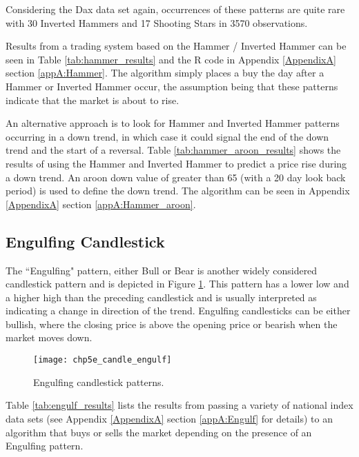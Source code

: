 Considering the Dax data set again, occurrences of these patterns are quite rare with 30 Inverted Hammers and 17 Shooting Stars in 3570 observations.

Results from a trading system based on the Hammer / Inverted Hammer can be seen in Table \ref{tab:hammer_results} and the R code in Appendix \ref{AppendixA} section \ref{appA:Hammer}. The algorithm simply places a buy the day after a Hammer or Inverted Hammer occur, the assumption being that these patterns indicate that the market is about to rise.




An alternative approach is to look for Hammer and Inverted Hammer patterns occurring in a down trend, in which case it could signal the end of the down trend and the start of a reversal. Table \ref{tab:hammer_aroon_results} shows the results of using the Hammer and Inverted Hammer to predict a price rise during a down trend. An aroon down value of greater than 65 (with a 20 day look back period) is used to define the down trend. The algorithm can be seen in Appendix \ref{AppendixA} section \ref{appA:Hammer_aroon}.  




\subsection{Engulfing Candlestick}
\label{sec:eng_cand}
The \textquotedblleft Engulfing" pattern, either Bull or Bear is another widely considered candlestick pattern and is depicted in Figure \ref{fig:chp5e:engulf}. This pattern has a lower low and a higher high than the preceding candlestick and is usually interpreted as indicating a change in direction of the trend. Engulfing candlesticks can be either bullish, where the closing price is above the opening price or bearish when the market moves down.

\begin{figure}[tbph]
\centering
\texttt{[image: chp5e\_candle\_engulf]}
\caption[Engulfing candlestick patterns]{Engulfing candlestick patterns.}
\label{fig:chp5e:engulf}
\end{figure}

Table \ref{tab:engulf_results} lists the results from passing a variety of national index data sets (see Appendix \ref{AppendixA} section \ref{appA:Engulf} for details) to an algorithm that buys or sells the market depending on the presence of an Engulfing pattern.


